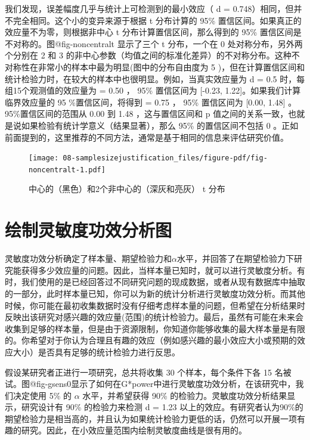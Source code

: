\documentclass[
  letterpaper,
  DIV=11,
  numbers=noendperiod]{scrreprt}
\begin{document}
我们发现，误差幅度几乎与统计上可检测到的最小效应（ d =
0.748）相同，但并不完全相同。这个小的变异来源于根据 t 分布计算的 95\%
置信区间。如果真正的效应量不为零，则根据非中心 t
分布计算置信区间，那么得到的 95\% 置信区间是不对称的。图@fig-noncentralt
显示了三个 t 分布，一个在 0 处对称分布，另外两个分别在 2 和 3
的非中心参数（均值之间的标准化差异）的不对称分布。这种不对称性在非常小的样本中最为明显(图中的分布自由度为
5
)，但在计算置信区间和统计检验力时，在较大的样本中也很明显。例如，当真实效应量为
d = 0.5 时，每组15个观测值的效应量为 = 0.50 ， 95\% 置信区间为 {[}-0.23,
1.22{]}。如果我们计算临界效应量的 95 \%置信区间，将得到 = 0.75 ， 95\%
置信区间为 {[}0.00, 1.48{]} 。95\%置信区间的范围从 0.00 到 1.48
，这与置信区间和 p
值之间的关系一致，也就是说如果检验有统计学意义（结果显著），那么 95\%
的置信区间不包括 0
。正如前面提到的，这里推荐的不同方法，通常是基于相同的信息来评估研究价值。

\begin{figure}

{\centering \texttt{[image: 08-samplesizejustification\_files/figure-pdf/fig-noncentralt-1.pdf]}

}

\caption{\label{fig-noncentralt}中心的（黑色）和2个非中心的（深灰和亮灰）
t 分布}

\end{figure}

\hypertarget{ux7ed8ux5236ux7075ux654fux5ea6ux529fux6548ux5206ux6790ux56fe}{%
\section{绘制灵敏度功效分析图}\label{ux7ed8ux5236ux7075ux654fux5ea6ux529fux6548ux5206ux6790ux56fe}}

灵敏度功效分析确定了样本量、期望检验力和\(\alpha\)水平，并回答了在期望检验力下研究能获得多少效应量的问题。因此，当样本量已知时，就可以进行灵敏度分析。有时，我们使用的是已经回答过不同研究问题的现成数据，或者从现有数据库中抽取的一部分，此时样本量已知，你可以为新的统计分析进行灵敏度功效分析。而其他时候，你可能在最初收集数据时没有仔细考虑样本量的问题，但希望在分析结果时反映出该研究对感兴趣的效应量(范围)的统计检验力。最后，虽然有可能在未来会收集到足够的样本量，但是由于资源限制，你知道你能够收集的最大样本量是有限的。你希望对于你认为合理且有趣的效应（例如感兴趣的最小效应大小或预期的效应大小）是否具有足够的统计检验力进行反思。

假设某研究者正进行一项研究，总共将收集 30 个样本，每个条件下各 15
名被试。图@fig-gsens0显示了如何在G*power中进行灵敏度功效分析，在该研究中，我们决定使用
5\% 的 \(\alpha\) 水平，并希望获得 90\%
的检验力。灵敏度功效分析结果显示，研究设计有 90\% 的检验力来检测 d =
1.23
以上的效应。有研究者认为90\%的期望检验力是相当高的，并且认为如果统计检验力更低的话，仍然可以开展一项有趣的研究。因此，在小效应量范围内绘制灵敏度曲线是很有用的。
\end{document}
